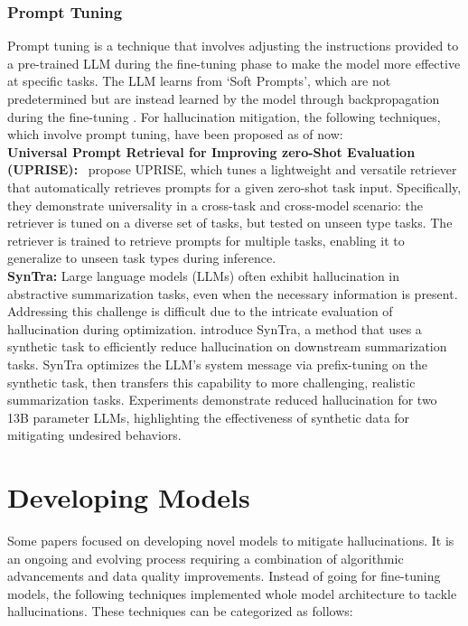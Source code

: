 \documentclass[11pt]{article}
\begin{document}
\subsubsection{Prompt Tuning}
\label{subsubsec:Prompt Tuning}
Prompt tuning is a technique that involves adjusting the instructions provided to a pre-trained LLM during the fine-tuning phase to make the model more effective at specific tasks. The LLM learns from `Soft Prompts', which are not predetermined but are instead learned by the model through backpropagation during the fine-tuning \cite{lester-etal-2021-power}. For hallucination mitigation, the following techniques, which involve prompt tuning, have been proposed as of now: \\  
\textbf{Universal Prompt Retrieval for Improving zero-Shot Evaluation (UPRISE):}~\cite{cheng2023uprise} propose UPRISE, which tunes a lightweight and versatile retriever that automatically retrieves prompts for a given zero-shot task input. Specifically, they demonstrate universality in a cross-task and cross-model scenario: the retriever is tuned on a diverse set of tasks, but tested on unseen type tasks. The retriever is trained to retrieve prompts for multiple tasks, enabling it to generalize to unseen task types during inference. \\
\textbf{SynTra:} Large language models (LLMs) often exhibit hallucination in abstractive summarization tasks, even when the necessary information is present. Addressing this challenge is difficult due to the intricate evaluation of hallucination during optimization. \cite{jones2023teaching} introduce SynTra, a method that uses a synthetic task to efficiently reduce hallucination on downstream summarization tasks. SynTra optimizes the LLM's system message via prefix-tuning on the synthetic task, then transfers this capability to more challenging, realistic summarization tasks. Experiments demonstrate reduced hallucination for two 13B parameter LLMs, highlighting the effectiveness of synthetic data for mitigating undesired behaviors.

\section{Developing Models}
\label{subsec:Developing Models}
Some papers focused on developing novel models to mitigate hallucinations. It is an ongoing and evolving process requiring a combination of algorithmic advancements and data quality improvements. Instead of going for fine-tuning models, the following techniques implemented whole model architecture to tackle hallucinations. These techniques can be categorized as follows:
\end{document}
